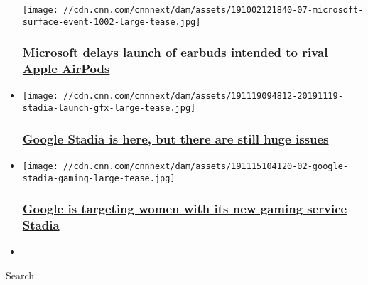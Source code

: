 \begin{itemize}
  \texttt{[image: //cdn.cnn.com/cnnnext/dam/assets/191002121840-07-microsoft-surface-event-1002-large-tease.jpg]}

  \hypertarget{microsoft-delays-launch-of-earbuds-intended-to-rival-apple-airpods}{%
  \subsubsection{\texorpdfstring{\href{/2019/11/21/tech/microsoft-surface-earbuds-airpods-rival-launch-delay/index.html}{Microsoft
  delays launch of earbuds intended to rival Apple
  AirPods}}{Microsoft delays launch of earbuds intended to rival Apple AirPods}}\label{microsoft-delays-launch-of-earbuds-intended-to-rival-apple-airpods}}
\item
  \href{/2019/11/19/tech/google-stadia-launch/index.html}{}

  \texttt{[image: //cdn.cnn.com/cnnnext/dam/assets/191119094812-20191119-stadia-launch-gfx-large-tease.jpg]}

  \hypertarget{google-stadia-is-here-but-there-are-still-huge-issues}{%
  \subsubsection{\texorpdfstring{\href{/2019/11/19/tech/google-stadia-launch/index.html}{Google
  Stadia is here, but there are still huge
  issues}}{Google Stadia is here, but there are still huge issues}}\label{google-stadia-is-here-but-there-are-still-huge-issues}}
\item
  \href{/2019/11/15/tech/google-stadia-women-gamers/index.html}{}

  \texttt{[image: //cdn.cnn.com/cnnnext/dam/assets/191115104120-02-google-stadia-gaming-large-tease.jpg]}

  \hypertarget{google-is-targeting-women-with-its-new-gaming-service-stadia}{%
  \subsubsection{\texorpdfstring{\href{/2019/11/15/tech/google-stadia-women-gamers/index.html}{Google
  is targeting women with its new gaming service
  Stadia}}{Google is targeting women with its new gaming service Stadia}}\label{google-is-targeting-women-with-its-new-gaming-service-stadia}}
\item
\end{itemize}

Search


